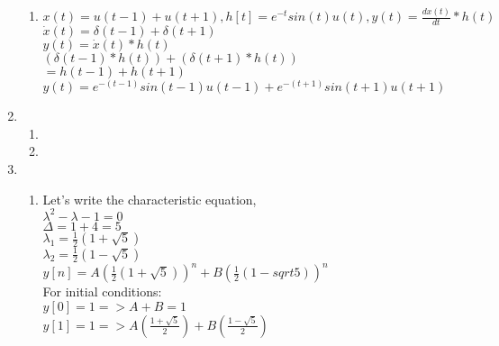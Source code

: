 \documentclass[10pt,a4paper, margin=1in]{article}
\begin{document}
\begin{enumerate}
\begin{enumerate}
    \item %
    $x(t) = u(t-1) + u(t+1), h[t] = e^{-t}sin(t)u(t), y(t) = \frac{dx(t)}{dt}*h(t)$\\

    $\dot{x}(t) = \delta(t-1)+\delta(t+1)$ \\

    $y(t) = \dot{x}(t) * h(t)$ \\

    $(\delta(t-1)*h(t)) + (\delta(t+1)*h(t))$ \\

    $=h(t - 1) + h(t + 1)$ \\

    $y(t) = e^{-(t-1)}sin(t-1)u(t-1) + e^{-(t+1)} sin(t+1)u(t+1)$
    \end{enumerate}

\item %
    \begin{enumerate}
    \item %
    \item %
    \end{enumerate}

\item %
    \begin{enumerate}   
    \item %
    Let's write the characteristic equation, \\

    $\lambda^2 -\lambda-1 = 0$ \\

    $\Delta = 1 + 4 = 5$ \\

    $\lambda_1 = \frac{1}{2}(1+\sqrt{5})$ \\

    $\lambda_2 = \frac{1}{2}(1-\sqrt{5})$ \\

    $y[n] = A(\frac{1}{2}(1+\sqrt{5}))^n + B (\frac{1}{2}(1-sqrt{5}))^n$\\

    For initial conditions: \\

    $y[0] = 1 => A + B = 1$ \\

    $y[1] = 1 => A(\frac{1+\sqrt{5}}{2}) + B(\frac{1-\sqrt{5}}{2})$ \\


\end{enumerate}
\end{enumerate}
\end{document}
